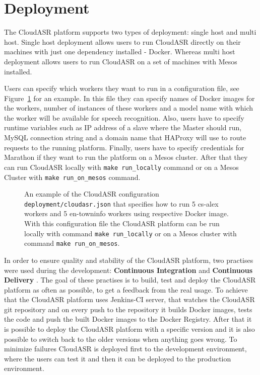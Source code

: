 \section{Deployment}
The CloudASR platform supports two types of deployment: single host and multi host.
Single host deployment allows users to run CloudASR directly on their machines with just one dependency installed - Docker.
Whereas multi host deployment allows users to run CloudASR on a set of machines with Mesos installed.

Users can specify which workers they want to run in a configuration file,
  see Figure~\ref{fig:cloudasr-json} for an example.
In this file they can specify names of Docker images for the workers,
  number of instances of these workers
  and a model name with which the worker will be available for speech recognition.
Also, users have to specify runtime variables such as IP address of a slave where the Master should run,
  MySQL connection string and
  a domain name that HAProxy will use to route requests to the running platform.
Finally, users have to specify credentials for Marathon if they want to run the platform on a Mesos cluster.
After that they can run CloudASR locally with \texttt{make run\_locally} command
  or on a Mesos Cluster with \texttt{make run\_on\_mesos} command.

\begin{figure}[h]
  

  \caption{
     An example of the CloudASR configuration \texttt{deployment/cloudasr.json}
       that specifies how to run 5 cs-alex workers and 5 en-towninfo workers
       using respective Docker image.
     With this configuration file the CloudASR platform can be run locally with command \texttt{make run\_locally}
       or on a Mesos cluster with command \texttt{make run\_on\_mesos}.
  }
  \label{fig:cloudasr-json}
\end{figure}


In order to ensure quality and stability of the CloudASR platform,
  two practises were used during the development:
  \textbf{Continuous Integration} \cite{fowler2006continuous} and \textbf{Continuous Delivery} \cite{humble2010continuous}.
The goal of these practises is to build, test and deploy the CloudASR platform as often as possible,
  to get a feedback from the real usage.
To achieve that the CloudASR platform uses Jenkins-CI server,
  that watches the CloudASR git repository
  and on every push to the repository it builds Docker images,
  tests the code
  and push the built Docker images to the Docker Registry.
After that it is possible to deploy the CloudASR platform with a specific version
  and it is also possible to switch back to the older versions when anything goes wrong.
To minimize failures CloudASR is deployed first to the development environment,
  where the users can test it
  and then it can be deployed to the production environment.


